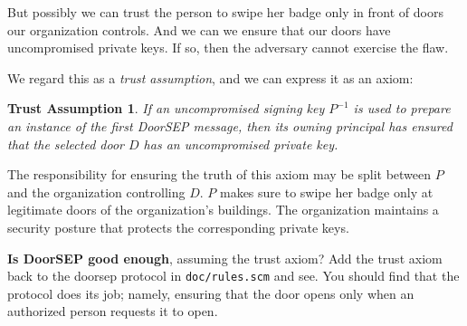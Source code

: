 \documentclass[12pt]{article}
\newcommand{\iv}[1]{\ensuremath{{#1}^{-1}}}
\newtheorem{axiom}{Trust Assumption}
\begin{document}
But possibly we can trust the person to swipe her badge only in front
of doors our organization controls.  And we can we ensure that our
doors have uncompromised private keys.  If so, then the adversary
cannot exercise the flaw.

We regard this as a \emph{trust assumption}, and we can express it as
an axiom:
%
\begin{axiom}\label{axiom:trust assumption}
  If an uncompromised signing key ${\iv{P}}$ is used to prepare an
  instance of the first DoorSEP message, then its owning principal has
  ensured that the selected door $D$ has an uncompromised private key.
\end{axiom}
%
The responsibility for ensuring the truth of this axiom may be split
between $P$ and the organization controlling $D$.  $P$ makes sure to
swipe her badge only at legitimate doors of the organization's
buildings.  The organization maintains a security posture that
protects the corresponding private keys.

\medskip\noindent\textbf{Is DoorSEP good enough}, assuming the trust
axiom?  Add the trust axiom back to the doorsep protocol in
\texttt{doc/rules.scm} and see.  You should find that the protocol
does its job; namely, ensuring that the door opens only when an
authorized person requests it to open.



\end{document}
